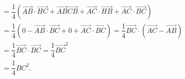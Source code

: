 \begin{bt}
{$$\begin{aligned}
&=\dfrac{1}{4}\left(\overrightarrow{AB}\cdot\overrightarrow{HC}+\overrightarrow{AB}\overrightarrow{CB}+\overrightarrow{AC}\cdot\overrightarrow{HB}+\overrightarrow{AC}\cdot\overrightarrow{BC}\right) \\
&=\dfrac{1}{4}\left(0-\overrightarrow{AB}\cdot\overrightarrow{BC}+0+\overrightarrow{AC}\cdot\overrightarrow{BC}\right)=\dfrac{1}{4}\overrightarrow{BC}\cdot\left(\overrightarrow{AC}-\overrightarrow{AB}\right) \\
&=\dfrac{1}{4}\overrightarrow{BC}\cdot\overrightarrow{BC}=\dfrac{1}{4}\overrightarrow{BC}^2 \\
&=\dfrac{1}{4}BC^2.
\end{aligned}$$
}
\end{bt}